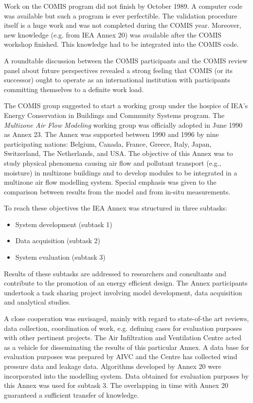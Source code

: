 \documentclass[10pt]{article}
\begin{document}
Work on the COMIS program did not finish by October 1989. A computer code was available but such a program is ever perfectible. The validation procedure itself is a huge work and was not completed during the COMIS year. Moreover, new knowledge (e.g. from IEA Annex 20) was available after the COMIS workshop finished. This knowledge had to be integrated into the COMIS code.

A roundtable discussion between the COMIS participants and the COMIS review panel about future perspectives revealed a strong feeling that COMIS (or its successor) ought to operate as an international institution with participants committing themselves to a definite work load.

The COMIS group suggested to start a working group under the hospice of IEA's Energy Conservation in Buildings and Community Systems program. The \emph{Multizone Air Flow Modeling} working group was officially adopted in June 1990 as Annex 23. The Annex was supported between 1990 and 1996 by nine participating nations: Belgium, Canada, France, Greece, Italy, Japan, Switzerland, The Netherlands, and USA. The objective of this Annex was to study physical phenomena causing air flow and pollutant transport (e.g., moisture) in multizone buildings and to develop modules to be integrated in a multizone air flow modelling system. Special emphasis was given to the comparison between results from the model and from in-situ measurements.

To reach these objectives the IEA Annex was structured in three subtasks:

\begin{itemize}
\item System development (subtask 1)
\item Data acquisition (subtask 2)
\item System evaluation (subtask 3)
\end{itemize}

Results of these subtasks are addressed to researchers and consultants and contribute to the promotion of an energy efficient design. The Annex participants undertook a task sharing project involving model development, data acquisition and analytical studies.

A close cooperation was envisaged, mainly with regard to state-of-the art reviews, data collection, coordination of work, e.g. defining cases for evaluation purposes with other pertinent projects. The Air Infiltration and Ventilation Centre acted as a vehicle for disseminating the results of this particular Annex. A data base for evaluation purposes was prepared by AIVC and the Centre has collected wind pressure data and leakage data. Algorithms developed by Annex 20 were incorporated into the modelling system. Data obtained for evaluation purposes by this Annex was used for subtask 3. The overlapping in time with Annex 20 guaranteed a sufficient transfer of knowledge.
\end{document}
